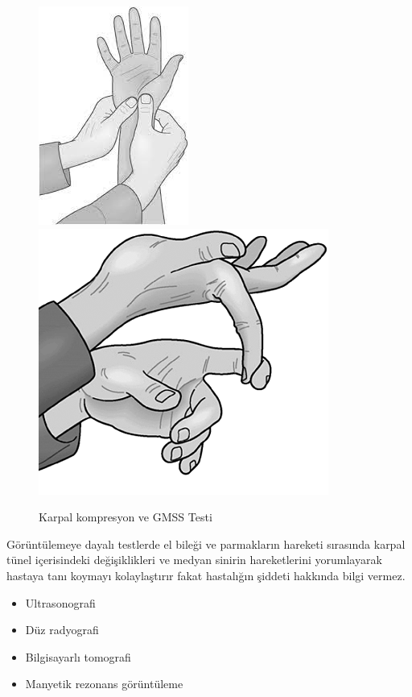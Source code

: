\documentclass[12pt,twoside]{deuthesis}
\begin{document}
\begin{figure}

{\centering \includegraphics[width=0.49\linewidth,height=0.18\textheight]{figure/karpal_komp} \includegraphics[width=0.49\linewidth,height=0.18\textheight]{figure/gerilmis} 

}

\caption{Karpal kompresyon ve GMSS Testi }\label{fig:unnamed-chunk-4}
\end{figure}
Görüntülemeye dayalı testlerde el bileği ve parmakların hareketi sırasında karpal tünel içerisindeki değişiklikleri ve medyan sinirin hareketlerini yorumlayarak hastaya tanı koymayı kolaylaştırır fakat hastalığın şiddeti hakkında bilgi vermez.
\begin{itemize}
\item
  Ultrasonografi
\item
  Düz radyografi
\item
  Bilgisayarlı tomografi
\item
  Manyetik rezonans görüntüleme
\end{itemize}
\end{document}
